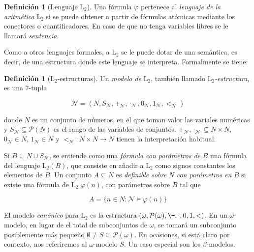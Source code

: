 \documentclass[11pt,a4paper]{book}
\theoremstyle{plain}
\theoremstyle{definition}
\newtheorem{definicion}[teorema]{Definición}
\theoremstyle{remark}
\begin{document}
\begin{definicion}[Lenguaje $\mathrm{L}_2$]
  \label{def-lenguaje-Z2}
  Una fórmula $\varphi$ pertenece al \textit{lenguaje de la aritmética} $\mathrm{L}_2$ si se puede obtener a partir de fórmulas atómicas mediante los conectores o cuantificadores. En caso de que no tenga variables libres se le llamará \textit{sentencia}.
\end{definicion}

Como a otros lenguajes formales, a $\mathrm{L}_2$ se le puede dotar de una semántica, es decir, de una estructura donde este lenguaje se interpreta. Formalmente se tiene: 

\begin{definicion}[$\mathrm{L}_2$-estructuras]
    
    Un \textit{modelo de} $\mathrm{L}_2$, también llamado $\mathrm{L}_2$\textit{-estructura}, es una 7-tupla

    $$ \mathcal{N} = (N, S_\mathcal{N}, +_\mathcal{N}, \cdot_\mathcal{N}, 0_\mathcal{N}, 1_\mathcal{N}, <_\mathcal{N}) $$

    donde $N$ es un conjunto de números, en el que toman valor las variales numéricas y $S_\mathcal{N} \subseteq \mathcal{P}(N)$ es el rango de las variables de conjuntos. $+_\mathcal{N}, \cdot_\mathcal{N} \subseteq N \times N$, $0_\mathcal{N} \in N$, $1_\mathcal{N} \in N$ y $<_\mathcal{N} : N \times N \rightarrow N$ tienen la interpretación habitual.

\end{definicion}

Si $B \subseteq N \cup S_\mathcal{N}$, se entiende como una \textit{fórmula con parámetros de} $B$ una fórmula del lenguaje $\mathrm{L}_2(B)$, que consiste en añadir a $\mathrm{L}_2$ como signos constantes los elementos de $B$. Un conjunto $A \subseteq N$ es \textit{definible sobre} $N$ \textit{con parámetros en} $B$ si existe una fórmula de $\mathrm{L}_2$ $\varphi(n)$, con parámetros sobre $B$ tal que

$$ A = \{  n \in N : \mathcal{N} \models \varphi(n) \} $$

El modelo \textit{canónico} para $\mathrm{L}_2$ es la estructura $(\omega, \mathcal{P}(\omega), \+, \cdot, 0, 1, <)$. En un $\omega$-modelo, en lugar de el total de subconjuntos de $\omega$, se tomará un subconjunto posiblemente más pequeño $\emptyset \neq S \subseteq \mathcal{P}(\omega)$. En ocasiones, si está claro por contexto, nos referiremos al $\omega$-modelo $S$. Un caso especial son los $\beta$-modelos.
\end{document}
